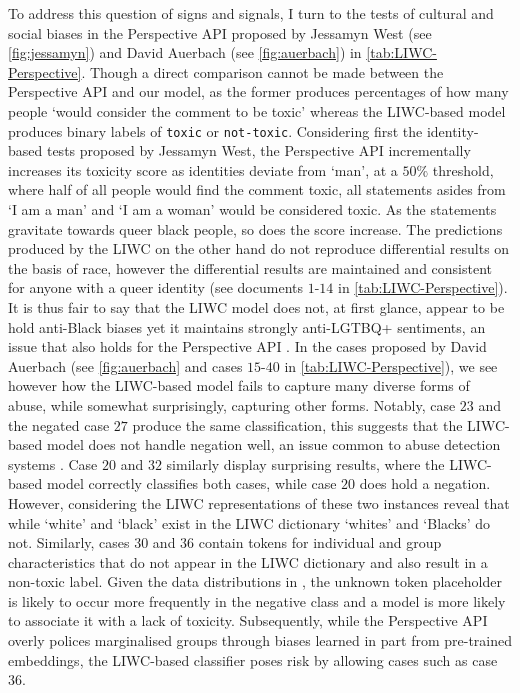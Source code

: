 To address this question of signs and signals, I turn to the tests of cultural and social biases in the Perspective API proposed by Jessamyn West (see \autoref{fig:jessamyn}) and David Auerbach (see \autoref{fig:auerbach}) in \autoref{tab:LIWC-Perspective}.
Though a direct comparison cannot be made between the Perspective API and our model, as the former produces percentages of how many people `would consider the comment to be toxic' \citep{Perspective:Github} whereas the LIWC-based model produces binary labels of \texttt{toxic} or \texttt{not-toxic}.
Considering first the identity-based tests proposed by Jessamyn West, the Perspective API incrementally increases its toxicity score as identities deviate from `man', at a $50\%$ threshold, where half of all people would find the comment toxic, all statements asides from `I am a man' and `I am a woman' would be considered toxic.
As the statements gravitate towards queer black people, so does the score increase.
The predictions produced by the LIWC on the other hand do not reproduce differential results on the basis of race, however the differential results are maintained and consistent for anyone with a queer identity (see documents $1$-$14$ in \autoref{tab:LIWC-Perspective}).
It is thus fair to say that the LIWC model does not, at first glance, appear to be hold anti-Black biases yet it maintains strongly anti-LGTBQ+ sentiments, an issue that also holds for the Perspective API \citep{Dias:2021}.
In the cases proposed by David Auerbach (see \autoref{fig:auerbach} and cases $15$-$40$ in \autoref{tab:LIWC-Perspective}), we see however how the LIWC-based model fails to capture many diverse forms of abuse, while somewhat surprisingly, capturing other forms.
Notably, case $23$ and the negated case $27$ produce the same classification, this suggests that the LIWC-based model does not handle negation well, an issue common to abuse detection systems \cite{Rottger:2021}.
Case $20$ and $32$ similarly display surprising results, where the LIWC-based model correctly classifies both cases, while case $20$ does hold a negation.
However, considering the LIWC representations of these two instances reveal that while `white' and `black' exist in the LIWC dictionary `whites' and `Blacks' do not.
Similarly, cases $30$ and $36$ contain tokens for individual and group characteristics that do not appear in the LIWC dictionary and also result in a non-toxic label.
Given the data distributions in \citet{Wulczyn:2017}, the unknown token placeholder is likely to occur more frequently in the negative class and a model is more likely to associate it with a lack of toxicity.
Subsequently, while the Perspective API overly polices marginalised groups through biases learned in part from pre-trained embeddings, the LIWC-based classifier poses risk by allowing cases such as case $36$.

